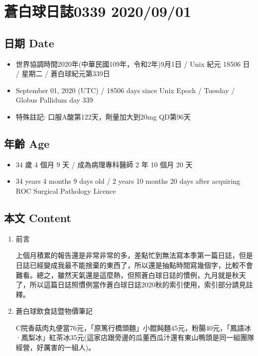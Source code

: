 \documentclass[
]{article}
\author{}
\date{}
\providecommand{\tightlist}{%
  \setlength{\itemsep}{0pt}\setlength{\parskip}{0pt}}
\begin{document}
\hypertarget{ux84bcux767dux7403ux65e5ux8a8c0339-20200901}{%
\section{蒼白球日誌0339
2020/09/01}\label{ux84bcux767dux7403ux65e5ux8a8c0339-20200901}}

\hypertarget{ux65e5ux671f-date}{%
\subsection{日期 Date}\label{ux65e5ux671f-date}}

\begin{itemize}
\tightlist
\item
  世界協調時間2020年(中華民國109年，令和2年)9月1日 / Unix 紀元 18506 日
  / 星期二 / 蒼白球紀元第339日
\item
  September 01, 2020 (UTC) / 18506 days since Unix Epoch / Tuesday /
  Globus Pallidum day 339
\item
  特殊註記: 口服A酸第122天，劑量加大到20mg QD第96天
\end{itemize}

\hypertarget{ux5e74ux9f61-age}{%
\subsection{年齡 Age}\label{ux5e74ux9f61-age}}

\begin{itemize}
\tightlist
\item
  34 歲 4 個月 9 天 / 成為病理專科醫師 2 年 10 個月 20 天
\item
  34 years 4 months 9 days old / 2 years 10 months 20 days after
  acquiring ROC Surgical Pathology Licence
\end{itemize}

\hypertarget{ux672cux6587-content}{%
\subsection{本文 Content}\label{ux672cux6587-content}}

\begin{enumerate}
\def\labelenumi{\arabic{enumi}.}
\item
  前言

  上個月積累的報告還是非常非常的多，差點忙到無法寫本季第一篇日誌，但是日誌已經變成我最不能捨棄的東西了，所以還是抽點時間寫幾個字，比較不會難看。總之，雖然天氣還是這麼熱，但照蒼白球日誌的慣例，九月就是秋天了，所以這篇日誌照慣例當作蒼白球日誌2020秋的索引使用，索引部分請見註釋。
\item
  蒼白球飲食誌暨物價筆記

  C院香菇肉丸便當76元，「原篤行橋頭麵」小餛飩麵45元，粉腸40元，「鳳語冰·鳳梨冰」紅茶冰35元(這家店跟旁邊的瓜董西瓜汁還有東山鴨頭是同一組團隊經營，好厲害的一組人)。
\end{enumerate}
\end{document}
